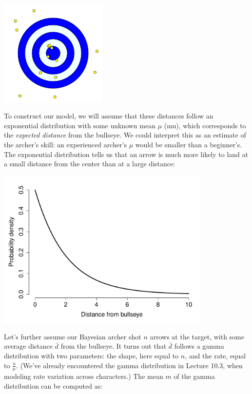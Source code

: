 \documentclass[12pt]{article}
\begin{document}
\begin{center}
\noindent\includegraphics[width=0.4\textwidth]{archery.png}
\end{center}

\noindent To construct our model, we will assume that these distances follow an exponential distribution with some unknown mean $\mu$ (mu), which corresponds to the \textit{expected distance} from the bullseye. We could interpret this as an estimate of the archer's skill: an experienced archer's $\mu$ would be smaller than a beginner's. The exponential distribution tells us that an arrow is much more likely to land at a small distance from the center than at a large distance:

\begin{center}
\noindent\includegraphics[width=0.8\textwidth]{target_accuracy.pdf}
\end{center}

\noindent Let's further assume our Bayesian archer shot $n$ arrows at the target, with some average distance $\bar{d}$ from the bullseye. It turns out that $\bar{d}$ follows a gamma distribution with two parameters: the shape, here equal to $n$, and the rate, equal to $\frac{n}{\mu}$. (We've already encountered the gamma distribution in Lecture 10.3, when modeling rate variation across characters.) The mean $m$ of the gamma distribution can be computed as:
\end{document}
